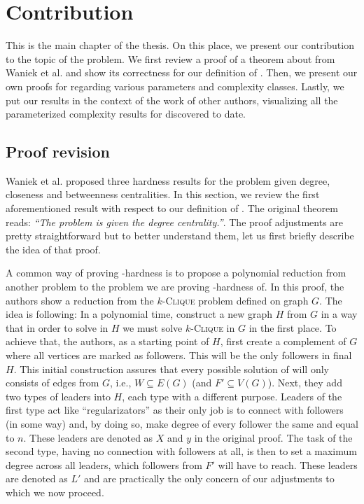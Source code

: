 \chapter{Contribution}\label{chapter:contribution}

This is the main chapter of the thesis.
On this place, we present our contribution to the topic of the \HL problem.
We first review a proof of a theorem about \HLdeg from Waniek et al. \cite{Waniek2017} and show
its correctness for our definition of \HL.
Then, we present our own proofs for \HLshort regarding various parameters and complexity classes.
Lastly, we put our results in the context of the work of other authors,
visualizing all the parameterized complexity results for \HLdeg discovered to date.


\section{Proof revision}\label{section:proofRevision}

Waniek et al. \cite{Waniek2017} proposed three hardness results for the \HL problem given degree, closeness and betweenness
centralities. In this section, we review the first aforementioned result with respect to our definition of \HLshort.
The original theorem reads: \emph{``The \HL problem is \NPc given the degree centrality.''}.
The proof adjustments are pretty straightforward but to better understand them,
let us first briefly describe the idea of that proof.

A common way of proving \NP-hardness is to propose a polynomial reduction from another \NPh problem to the
problem we are proving \NP-hardness of.
In this proof, the authors show a reduction from the $k$-\textsc{Clique} problem defined on graph $G$.
The idea is following: In a polynomial time, construct a new graph $H$ from $G$ in a way that
in order to solve \HL in $H$ we must solve $k$-\textsc{Clique} in $G$ in the first place.
To achieve that, the authors, as a starting point of $H$, first create a complement of $G$ 
where all vertices are marked as followers. This will be the only followers in final $H$.
This initial construction assures that every possible solution of \HLshort will only consists of edges from $G$, i.e.,
$W \subseteq E(G)$ (and $F' \subseteq V(G)$).
Next, they add two types of leaders into $H$, each type with a different purpose.
Leaders of the first type act like ``regularizators'' as their only job is to connect with followers (in some way) and,
by doing so, make degree of every follower the same and equal to $n$.
These leaders are denoted as $X$ and $y$ in the original proof.
The task of the second type, having no connection with followers at all,
is then to set a maximum degree across all leaders, which followers from $F'$ will have to reach.
These leaders are denoted as $L'$ and are practically the only concern of our adjustments to which we now proceed.

